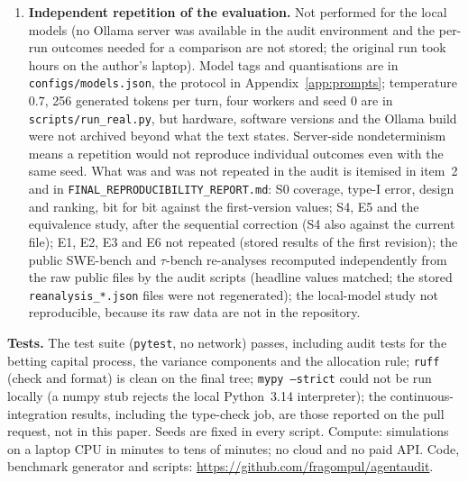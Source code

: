 \begin{enumerate}
\item \textbf{Independent repetition of the evaluation.} Not performed for the local models (no Ollama server was available in the audit environment and the per-run outcomes needed for a comparison are not stored; the original run took hours on the author's laptop). Model tags and quantisations are in \texttt{configs/models.json}, the protocol in Appendix~\ref{app:prompts}; temperature $0.7$, 256 generated tokens per turn, four workers and seed 0 are in \texttt{scripts/run\_real.py}, but hardware, software versions and the Ollama build were not archived beyond what the text states. Server-side nondeterminism means a repetition would not reproduce individual outcomes even with the same seed. What was and was not repeated in the audit is itemised in item~2 and in \texttt{FINAL\_REPRODUCIBILITY\_REPORT.md}: S0 coverage, type-I error, design and ranking, bit for bit against the first-version values; S4, E5 and the equivalence study, after the sequential correction (S4 also against the current file); E1, E2, E3 and E6 not repeated (stored results of the first revision); the public SWE-bench and $\tau$-bench re-analyses recomputed independently from the raw public files by the audit scripts (headline values matched; the stored \texttt{reanalysis\_*.json} files were not regenerated); the local-model study not reproducible, because its raw data are not in the repository.
\end{enumerate}
\textbf{Tests.} The test suite (\texttt{pytest}, no network) passes, including audit tests for the betting capital process, the variance components and the allocation rule; \texttt{ruff} (check and format) is clean on the final tree; \texttt{mypy --strict} could not be run locally (a numpy stub rejects the local Python~3.14 interpreter); the continuous-integration results, including the type-check job, are those reported on the pull request, not in this paper. Seeds are fixed in every script. Compute: simulations on a laptop CPU in minutes to tens of minutes; no cloud and no paid API. Code, benchmark generator and scripts: \url{https://github.com/fragompul/agentaudit}.
